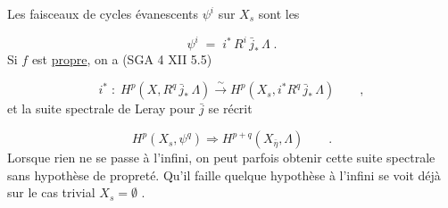 \begin{center}
\end{center}
Les faisceaux de cycles évanescents  $\psi^i$  sur  $X_s$  sont les

\begin{equation*}\tag{2.2.1}
\psi^i \;=\; i^{*}\, R^i\, \bar{j}_{*}\, \Lambda \;.
\end{equation*}
Si  $f$  est \underline{propre}, on a (SGA 4 XII 5.5)

\begin{equation*}\tag{2.2.2}
i^{*} \;:\; H^p(X,R^q\,\bar{j}_{*}\,\Lambda) \xrightarrow{\ \sim\ } H^p(X_s,i^{*}R^q\,\bar{j}_{*}\,\Lambda) \qquad ,
\end{equation*}
et la suite spectrale de Leray pour  $\bar{j}$  se récrit

\begin{equation*}\tag{2.2.3}
H^p(X_s,\psi^q) \Longrightarrow H^{p+q}(X_{\bar{\eta}},\Lambda) \qquad .
\end{equation*}
Lorsque rien ne se passe à l'infini, on peut parfois obtenir cette suite spectrale sans hypothèse de propreté.  Qu'il faille quelque hypothèse à l'infini se voit déjà sur le cas trivial  $X_s = \emptyset$ .

